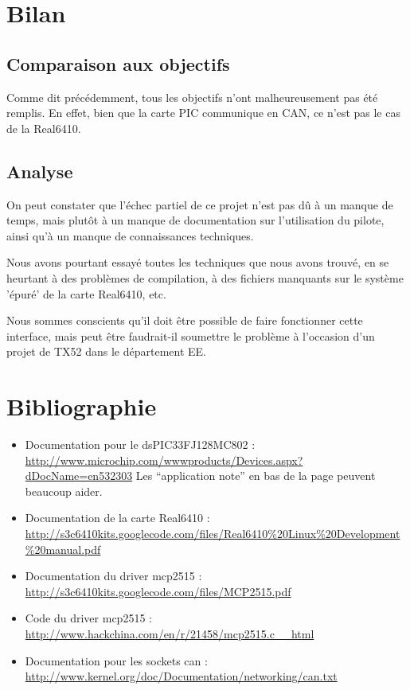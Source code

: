 \documentclass[a4,french,12pt]{article}
\begin{document}
\newpage
\section{Bilan}
\subsection{Comparaison aux objectifs}
Comme dit précédemment, tous les objectifs n'ont malheureusement pas été remplis. En effet, bien que la carte PIC communique en CAN, ce n'est pas le cas de la Real6410.

\subsection{Analyse}
On peut constater que l'échec partiel de ce projet n'est pas dû à un manque de temps, mais plutôt à un manque de documentation sur l'utilisation du pilote, ainsi qu'à un manque de connaissances techniques. 

Nous avons pourtant essayé toutes les techniques que nous avons trouvé, en se heurtant à des problèmes de compilation, à des fichiers manquants sur le système 'épuré' de la carte Real6410, etc.

Nous sommes conscients qu'il doit être possible de faire fonctionner cette interface, mais peut être faudrait-il soumettre le problème à l'occasion d'un projet de TX52 dans le département EE.


\newpage
\section{Bibliographie}
\begin{itemize}
  \item Documentation pour le dsPIC33FJ128MC802 : \\
    \href{http://www.microchip.com/wwwproducts/Devices.aspx?dDocName=en532302}
         {http://www.microchip.com/wwwproducts/Devices.aspx?dDocName=en532303} 
    Les ``application note'' en bas de la page peuvent beaucoup aider.
  \item Documentation de la carte Real6410 : \\
    \href{http://s3c6410kits.googlecode.com/files/Real6410\%20Linux\%20Development\%20manual.pdf}
         {http://s3c6410kits.googlecode.com/files/Real6410\%20Linux\%20Development\%20manual.pdf} 
  \item Documentation du driver mcp2515 : \\
    \href{http://s3c6410kits.googlecode.com/files/MCP2515.pdf}
         {http://s3c6410kits.googlecode.com/files/MCP2515.pdf} 
  \item Code du driver mcp2515 : \\
    \href{http://www.hackchina.com/en/r/21458/mcp2515.c\_\_html}
         {http://www.hackchina.com/en/r/21458/mcp2515.c\_\_html} 
  \item Documentation pour les sockets can : \\
    \href{http://www.kernel.org/doc/Documentation/networking/can.txt}
         {http://www.kernel.org/doc/Documentation/networking/can.txt} 
\end{itemize}
\end{document}
